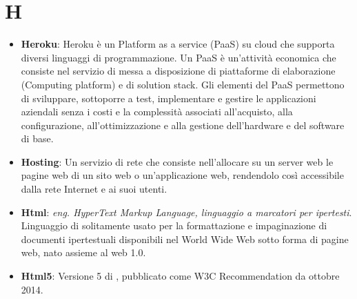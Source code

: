 \section{H}
\begin{itemize}
	\item
	\textbf{Heroku}: Heroku è un Platform as a service (PaaS) su cloud che supporta diversi linguaggi di programmazione. Un PaaS è un'attività economica che consiste nel servizio di messa a disposizione di piattaforme di elaborazione (Computing platform) e di solution stack. Gli elementi del PaaS permettono di sviluppare, sottoporre a test, implementare e gestire le applicazioni aziendali senza i costi e la complessità associati all'acquisto, alla configurazione, all'ottimizzazione e alla gestione dell'hardware e del software di base.
	\item
	\textbf{Hosting}: Un servizio di rete che consiste nell'allocare su un server web le pagine web di un sito web o un'applicazione web, rendendolo così accessibile dalla rete Internet e ai suoi utenti.
	\item
	\textbf{Html}: \textit{eng. HyperText Markup Language, linguaggio a marcatori per ipertesti}. Linguaggio di  solitamente usato per la formattazione e impaginazione di documenti ipertestuali disponibili nel World Wide Web sotto forma di pagine web, nato assieme al web 1.0.
	\item
	\textbf{Html5}: Versione 5 di , pubblicato come W3C Recommendation da ottobre 2014.
\end{itemize}
\newpage